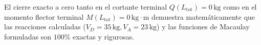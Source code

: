 \documentclass[10pt,a4paper]{article}
\begin{document}
\vspace{6pt}

\begin{tcolorbox}[enhanced,colback=MathcadGreen!10,colframe=MathcadGreen,sharp corners,boxrule=1pt,title=\textbf{Conclusión y Certificación de Equilibrio}]
El cierre exacto a cero tanto en el cortante terminal $Q(L_{\text{tot}}) = 0\,\text{kg}$ como en el momento flector terminal $M(L_{\text{tot}}) = 0\,\text{kg}\cdot\text{m}$ demuestra matemáticamente que las reacciones calculadas ($V_D = 35\,\text{kg}, V_A = 23\,\text{kg}$) y las funciones de Macaulay formuladas son $100\%$ exactas y rigurosas.
\end{tcolorbox}
\end{document}

